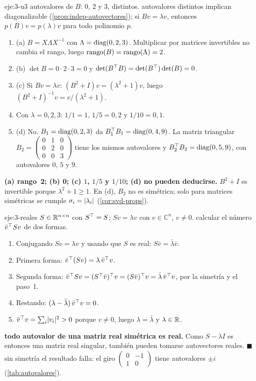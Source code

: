 \begin{solucion}{eje:3-u3}
\datos autovalores de $B$: $0$, $2$ y $3$, distintos.
\planteamiento autovalores distintos implican diagonalizable (\cref{prop:indep-autovectores}); si $Bv=\lambda v$, entonces $p(B)v=p(\lambda)v$ para todo polinomio $p$.
\pasos
\begin{enumerate}[label=\arabic*.]
  \item (a) $B=X\Lambda X^{-1}$ con $\Lambda=\operatorname{diag}(0,2,3)$. Multiplicar por matrices invertibles no cambia el rango, luego $\operatorname{rango}(B)=\operatorname{rango}(\Lambda)=2$.
  \item (b) $\det B=0\cdot 2\cdot 3=0$ y $\det(B^{\top} B)=\det(B^{\top})\det(B)=0$.
  \item (c) Si $Bv=\lambda v$: $(B^{2}+I)v=(\lambda^{2}+1)v$, luego $(B^{2}+I)^{-1}v=v/(\lambda^{2}+1)$.
  \item Con $\lambda=0,2,3$: $1/1=1$, $1/5=0{,}2$ y $1/10=0{,}1$.
  \item (d) No. $B_1=\operatorname{diag}(0,2,3)$ da $B_1^{\top} B_1=\operatorname{diag}(0,4,9)$. La matriz triangular $B_2=\begin{pmatrix}0&1&0\\0&2&0\\0&0&3\end{pmatrix}$ tiene los mismos autovalores y $B_2^{\top} B_2=\operatorname{diag}(0,5,9)$, con autovalores $0$, $5$ y $9$.
\end{enumerate}
\resultado \textbf{(a) rango~2; (b) 0; (c) $1$, $1/5$ y $1/10$; (d) no pueden deducirse.}
\comprobacion $B^{2}+I$ es invertible porque $\lambda^{2}+1\ge 1$. En (d), $B_2$ no es simétrica; solo para matrices simétricas se cumple $\sigma_i=\lvert\lambda_i\rvert$ (\cref{cor:svd-props}).
\end{solucion}

\begin{solucion}{eje:3-reales}
\datos $S\in\mathbb{R}^{n\times n}$ con $S^{\top}=S$; $Sv=\lambda v$ con $v\in\mathbb{C}^{n}$, $v\ne 0$.
\planteamiento calcular el número $\bar v^{\top} Sv$ de dos formas.
\pasos
\begin{enumerate}[label=\arabic*.]
  \item Conjugando $Sv=\lambda v$ y usando que $S$ es real: $S\bar v=\bar\lambda\bar v$.
  \item Primera forma: $\bar v^{\top}(Sv)=\lambda\,\bar v^{\top} v$.
  \item Segunda forma: $\bar v^{\top} Sv=(S^{\top}\bar v)^{\top} v=(S\bar v)^{\top} v=\bar\lambda\,\bar v^{\top} v$, por la simetría y el paso~1.
  \item Restando: $(\lambda-\bar\lambda)\,\bar v^{\top} v=0$.
  \item $\bar v^{\top} v=\sum_i\lvert v_i\rvert^{2}>0$ porque $v\ne 0$, luego $\lambda=\bar\lambda$ y $\lambda\in\mathbb{R}$.
\end{enumerate}
\resultado \textbf{todo autovalor de una matriz real simétrica es real.} Como $S-\lambda I$ es entonces una matriz real singular, también pueden tomarse autovectores reales. \hfill$\blacksquare$
\comprobacion sin simetría el resultado falla: el giro $\begin{pmatrix}0&-1\\1&0\end{pmatrix}$ tiene autovalores $\pm i$ (\cref{tab:autovalores}).
\end{solucion}

